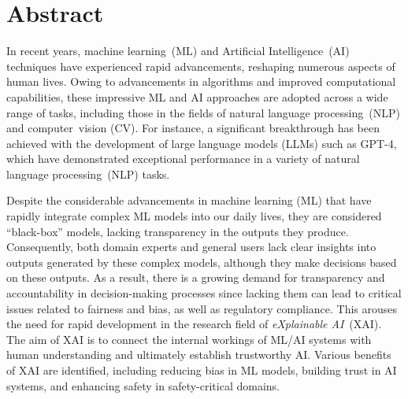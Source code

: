 
\section*{Abstract}

In recent years, machine learning~(ML) and Artificial Intelligence~(AI) techniques have
experienced rapid advancements, reshaping numerous aspects of human lives.
%
Owing to advancements in algorithms and improved computational capabilities, 
these impressive ML and AI approaches are adopted across a wide range of tasks, 
including those in the fields of natural language processing~(NLP) and computer~vision (CV).
%
For instance, a significant breakthrough has been achieved with the development of 
large language models (LLMs) such as GPT-4, which have demonstrated exceptional 
performance in a variety of natural language processing~(NLP) tasks.

Despite the considerable advancements in machine learning (ML) that 
have rapidly integrate complex ML models into our daily lives, 
they are considered ``black-box'' models, lacking transparency in the outputs they produce. 
%
Consequently, both domain experts and general users lack 
clear insights into outputs generated by these complex models, 
although they make decisions based on these outputs.
%
As a result, there is a growing demand for transparency and accountability in 
decision-making processes since lacking them can lead to critical issues related to fairness and bias, 
as well as regulatory compliance. 
%
This arouses the need for rapid development in the research field of \emph{eXplainable AI}~(XAI).
%
The aim of XAI is to connect the internal workings of ML/AI systems with human understanding
and ultimately establish trustworthy AI.
%
Various benefits of XAI are identified, including reducing bias in ML models,
building trust in AI systems, and enhancing safety in safety-critical domains.


